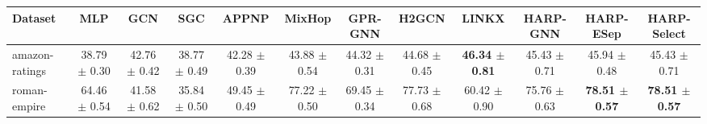 \begin{tabular}{lccccccccccc}
\toprule
Dataset & MLP & GCN & SGC & APPNP & MixHop & GPR-GNN & H2GCN & LINKX & HARP-GNN & HARP-ESep & HARP-Select \\
\midrule
amazon-ratings & 38.79 $\pm$ 0.30 & 42.76 $\pm$ 0.42 & 38.77 $\pm$ 0.49 & 42.28 $\pm$ 0.39 & 43.88 $\pm$ 0.54 & 44.32 $\pm$ 0.31 & 44.68 $\pm$ 0.45 & \textbf{46.34 $\pm$ 0.81} & 45.43 $\pm$ 0.71 & 45.94 $\pm$ 0.48 & 45.43 $\pm$ 0.71 \\
roman-empire & 64.46 $\pm$ 0.54 & 41.58 $\pm$ 0.62 & 35.84 $\pm$ 0.50 & 49.45 $\pm$ 0.49 & 77.22 $\pm$ 0.50 & 69.45 $\pm$ 0.34 & 77.73 $\pm$ 0.68 & 60.42 $\pm$ 0.90 & 75.76 $\pm$ 0.63 & \textbf{78.51 $\pm$ 0.57} & \textbf{78.51 $\pm$ 0.57} \\
\bottomrule
\end{tabular}
